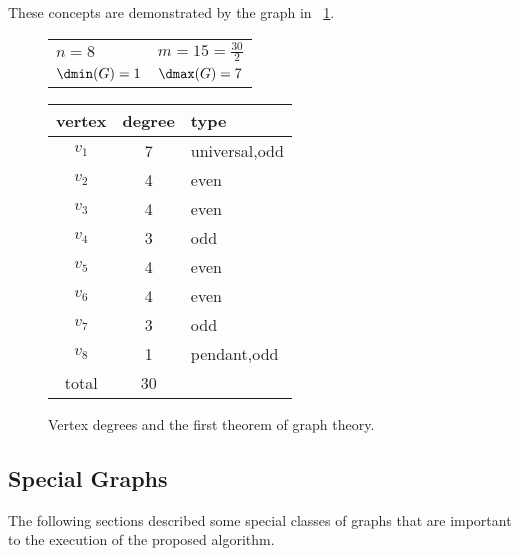 These concepts are demonstrated by the graph in \figurename~\ref{fig:degree}.

\begin{figure}[H]
  \begin{minipage}{3.25in}
    \centering

    \bigskip

    \begin{tabular}{ll}
      \(n=8\) & \(m=15=\frac{30}{2}\) \\
      \(\dmin(G)=1\) & \(\dmax(G)=7\)
    \end{tabular}
  \end{minipage}
  \begin{minipage}{2.5in}
    \begin{tabular}{c|c|l}
      vertex & degree & type \\
      \hline
      \(v_1\) & 7 & universal,odd \\
      \(v_2\) & 4 & even \\
      \(v_3\) & 4 & even \\
      \(v_4\) & 3 & odd \\
      \(v_5\) & 4 & even \\
      \(v_6\) & 4 & even \\
      \(v_7\) & 3 & odd \\
      \(v_8\) & 1 & pendant,odd \\
      \hline
      total & 30 &
    \end{tabular}
  \end{minipage}
  \caption{Vertex degrees and the first theorem of graph theory.}
  \label{fig:degree}
\end{figure}

\subsection{Special Graphs}\label{sec:sub:special}

The following sections described some special classes of graphs that are important to the execution of the proposed
algorithm.

